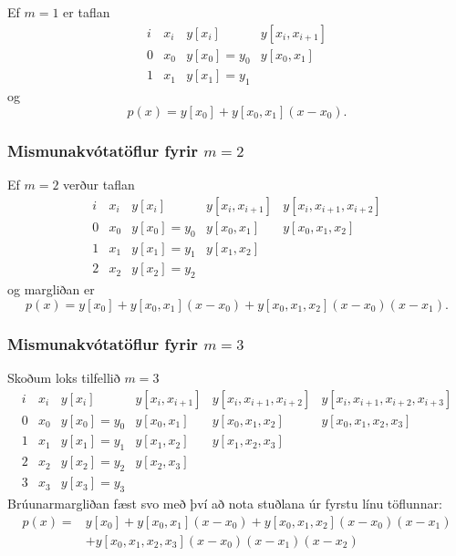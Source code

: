 \documentclass[icelandic,a4paper,12pt]{article}
\begin{document}
Ef $m = 1$ er taflan
\begin{equation*}
  \begin{array}{c|c|cc}
    i & x_i & y[x_i] & y[x_i,x_{i+1}] \\
    \hline
    0 & x_0 & y[x_0] = y_0 & y[x_0,x_1] \\
    1 & x_1 & y[x_1] = y_1 & 
  \end{array}
\end{equation*}
og
\begin{equation*}
  p(x) = y[x_0] + y[x_0,x_1](x-x_0).
\end{equation*}


\subsubsection{Mismunakvótatöflur fyrir $m=2$} 

Ef $m = 2$ verður taflan
\begin{equation*}
  \begin{array}{c|c|ccc}
    i & x_i & y[x_i] & y[x_i,x_{i+1}] & y[x_i,x_{i+1},x_{i+2}] \\
    \hline
    0 & x_0 & y[x_0] = y_0 & y[x_0,x_1] & y[x_0,x_1,x_2] \\
    1 & x_1 & y[x_1] = y_1 & y[x_1,x_2] & \\
    2 & x_2 & y[x_2] = y_2 &  & 
  \end{array}
\end{equation*}
og margliðan er
\begin{equation*}
  p(x) = y[x_0] + y[x_0,x_1](x-x_0) 
  + y[x_0,x_1,x_2](x-x_0)(x-x_1).
\end{equation*}


\subsubsection{Mismunakvótatöflur fyrir $m=3$} 
Skoðum loks tilfellið $m = 3$
\begin{equation*}
  \begin{array}{c|c|cccc}
    i & x_i & y[x_i] & y[x_i,x_{i+1}] & y[x_i,x_{i+1},x_{i+2}]
    & y[x_i,x_{i+1},x_{i+2},x_{i+3}] \\
    \hline
    0 & x_0 & y[x_0] = y_0 & y[x_0,x_1] & y[x_0,x_1,x_2]
    & y[x_0,x_1,x_2,x_3] \\
    1 & x_1 & y[x_1] = y_1 & y[x_1,x_2] & y[x_1,x_2,x_3] & \\
    2 & x_2 & y[x_2] = y_2 & y[x_2,x_3] & & \\
    3 & x_3 & y[x_3] = y_3 & & &
  \end{array}
\end{equation*}\pause
Brúunarmargliðan fæst svo með því að nota stuðlana úr fyrstu línu töflunnar:
\begin{align*}
  p(x) = &y[x_0] + y[x_0,x_1](x-x_0) 
  + y[x_0,x_1,x_2](x-x_0)(x-x_1) \\ 
  &+ y[x_0,x_1,x_2,x_3](x-x_0)(x-x_1)(x-x_2)
\end{align*}
\end{document}
